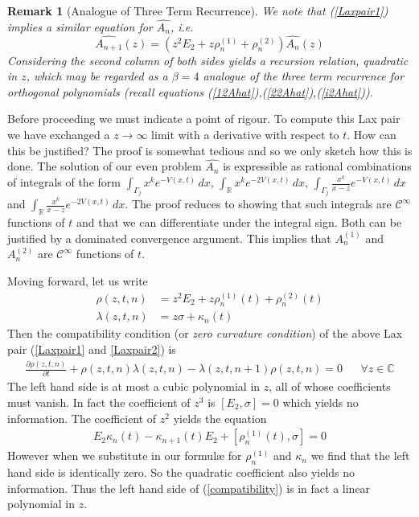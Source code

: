\documentclass[12pt]{article}
\newtheorem{remark}[theorem]{Remark}
\theoremstyle{definition}
\begin{document}
\begin{remark}[Analogue of Three Term Recurrence]\label{recurrence} We note that (\ref{Laxpair1}) implies a similar equation for $\widehat{A_n}$, i.e.
$$\widehat{A_{n+1}}(z) = \left( z^2 E_2 + z \rho_n^{(1)} + \rho_n^{(2)} \right) \widehat{A_{n}}(z) $$
Considering the second column of both sides yields a recursion relation, quadratic in $z$, which may be regarded as a $\beta = 4$ analogue of the three term recurrence for orthogonal polynomials (recall equations (\ref{12Ahat}),(\ref{22Ahat}),(\ref{i2Ahat})).
\end{remark}

Before proceeding we must indicate a point of rigour.  To compute this Lax pair we have exchanged a $z \to \infty$ limit with a derivative with respect to $t$. How can this be justified? The proof is somewhat tedious and so we only sketch how this is done.  The solution of our even problem $\widehat{A_n}$ is expressible as rational combinations of integrals of the form $\int_{\Gamma_j} x^k e^{-V(x,t)} \,dx$,  $\int_{\mathbb{R}} x^k e^{-2V(x,t)} \,dx$, $\int_{\Gamma_j} \frac{x^k}{x-z} e^{-V(x,t)} \,dx$ and $\int_{\mathbb{R}} \frac{x^k}{x-z} e^{-2V(x,t)} \,dx$. The proof reduces to showing that such integrals are $\mathcal{C}^\infty$ functions of $t$ and that we can differentiate under the integral sign. Both can be justified by a dominated convergence argument. This implies that $A_n^{(1)}$ and $A_n^{(2)}$ are $\mathscr{C}^\infty$ functions of $t$.

Moving forward, let us write
\begin{align*}
\rho(z,t,n) &= z^2 E_2 + z \rho_n^{(1)}(t) + \rho_n^{(2)}(t) \\
\lambda(z,t,n) &= z \sigma + \kappa_n(t) 
\end{align*}
Then the compatibility condition (or \textit{zero curvature condition}) of the above Lax pair (\ref{Laxpair1} and \ref{Laxpair2}) is
\begin{align}\label{compatibility}
\frac{\partial \rho(z,t,n)}{\partial t}  + \rho(z,t,n) \lambda(z,t,n)-\lambda(z,t,n+1) \rho(z,t,n)=0 & & \forall z \in \mathbb{C} 
\end{align}
The left hand side is at most a cubic polynomial in $z$, all of whose coefficients must vanish. In fact the coefficient of $z^3$ is $[E_2, \sigma] = 0$ which yields no information. The coefficient of $z^2$ yields the equation
\begin{align}
E_2 \kappa_n(t) - \kappa_{n+1}(t) E_2 + [ \rho_n^{(1)}(t),\sigma] = 0
\end{align}
However when we substitute in our formulæ for $\rho_n^{(1)}$ and $\kappa_n$ we find that the left hand side is identically zero. So the quadratic coefficient also yields no information. Thus the left hand side of 
(\ref{compatibility}) is in fact a linear polynomial in $z$.
\end{document}
